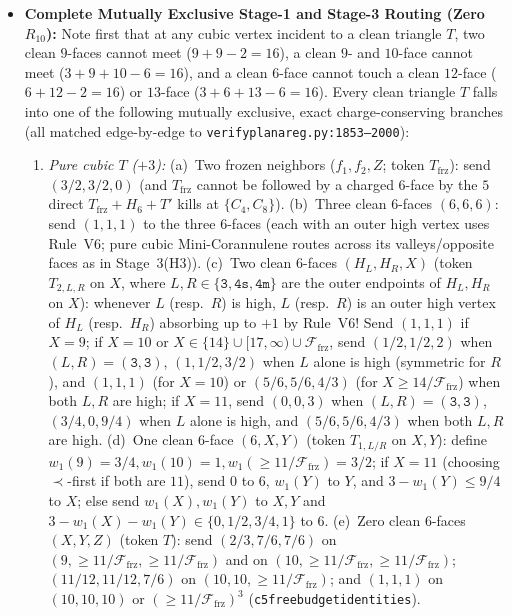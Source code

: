 \documentclass[11pt,reqno]{amsart}
\theoremstyle{plain}
\theoremstyle{definition}
\theoremstyle{remark}
\newcommand{\Ffrz}{\mathcal{F}_{\mathrm{frz}}}
\DeclareRobustCommand{\_}{\ifmmode\text{\textunderscore}\else\textunderscore\allowbreak\fi}
\begin{document}
\begin{itemize}[leftmargin=1.8em]
  \item \textbf{Complete Mutually Exclusive Stage-1 and Stage-3 Routing (Zero $R_{10}$):} Note first that at any cubic vertex incident to a clean triangle $T$, two clean $9$-faces cannot meet ($9+9-2=16$), a clean $9$- and $10$-face cannot meet ($3+9+10-6=16$), and a clean $6$-face cannot touch a clean $12$-face ($6+12-2=16$) or $13$-face ($3+6+13-6=16$). Every clean triangle $T$ falls into one of the following mutually exclusive, exact charge-conserving branches (all matched edge-by-edge to \texttt{verify\_planar\_eg.py:1853--2000}):
  \begin{enumerate}[label=(\roman*),leftmargin=2.0em]
    \item \emph{Pure cubic $T$ ($+3$):}
      (a)~Two frozen neighbors ($f_1, f_2, Z$; token $T_{\mathrm{frz}}$): send $(3/2, 3/2, 0)$ (and $T_{\mathrm{frz}}$ cannot be followed by a charged $6$-face by the $5$ direct $T_{\mathrm{frz}} + H_6 + T'$ kills at $\{C_4, C_8\}$).
      (b)~Three clean $6$-faces $(6, 6, 6)$: send $(1, 1, 1)$ to the three $6$-faces (each with an outer high vertex uses Rule~V6; pure cubic Mini-Corannulene routes across its valleys/opposite faces as in Stage~3(H3)).
      (c)~Two clean $6$-faces $(H_L, H_R, X)$ (token $T_{2,L,R}$ on $X$, where $L, R \in \{\texttt{3}, \texttt{4s}, \texttt{4m}\}$ are the outer endpoints of $H_L, H_R$ on $X$): whenever $L$ (resp.\ $R$) is high, $L$ (resp.\ $R$) is an outer high vertex of $H_L$ (resp.\ $H_R$) absorbing up to $+1$ by Rule~V6! Send $(1, 1, 1)$ if $X = 9$; if $X = 10$ or $X \in \{14\} \cup [17,\infty) \cup \Ffrz$, send $(1/2, 1/2, 2)$ when $(L, R) = (\texttt{3}, \texttt{3})$, $(1, 1/2, 3/2)$ when $L$ alone is high (symmetric for $R$), and $(1, 1, 1)$ (for $X=10$) or $(5/6, 5/6, 4/3)$ (for $X \ge 14/\Ffrz$) when both $L, R$ are high; if $X = 11$, send $(0, 0, 3)$ when $(L, R) = (\texttt{3}, \texttt{3})$, $(3/4, 0, 9/4)$ when $L$ alone is high, and $(5/6, 5/6, 4/3)$ when both $L, R$ are high.
      (d)~One clean $6$-face $(6, X, Y)$ (token $T_{1,L/R}$ on $X, Y$): define $w_1(9) = 3/4, w_1(10) = 1, w_1(\ge 11/\Ffrz) = 3/2$; if $X = 11$ (choosing $\prec$-first if both are $11$), send $0$ to $6$, $w_1(Y)$ to $Y$, and $3 - w_1(Y) \le 9/4$ to $X$; else send $w_1(X), w_1(Y)$ to $X, Y$ and $3 - w_1(X) - w_1(Y) \in \{0, 1/2, 3/4, 1\}$ to $6$.
      (e)~Zero clean $6$-faces $(X, Y, Z)$ (token $T$): send $(2/3, 7/6, 7/6)$ on $(9, \ge 11/\Ffrz, \ge 11/\Ffrz)$ and on $(10, \ge 11/\Ffrz, \ge 11/\Ffrz)$; $(11/12, 11/12, 7/6)$ on $(10, 10, \ge 11/\Ffrz)$; and $(1, 1, 1)$ on $(10, 10, 10)$ or $(\ge 11/\Ffrz)^3$ (\texttt{c5free\_budget\_identities}).

\end{enumerate}
\end{itemize}
\end{document}
